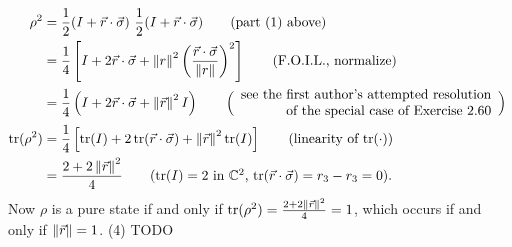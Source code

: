 \begin{align*}
    \rho^2 &= \frac{1}{2} (I + \vec{r} \cdot \vec{\sigma})~ \frac{1}{2} (I + \vec{r} \cdot \vec{\sigma}) \tag{part (1) above}\\
        &= \frac{1}{4} \left[ I + 2 \vec{r}\cdot \vec{\sigma} + \norm{r}^2\left(\frac{\vec{r}\cdot\vec{\sigma}}{\norm{r}}\right)^2\right] \tag{F.O.I.L., normalize}\\
        &= \frac{1}{4} \left(I + 2 \vec{r}\cdot \vec{\sigma} + \norm{\vec{r}}^2 I \right) \tag*{$\Bigl(\Bigr. \begin{array}{r}\text{see the first author's attempted resolution}\\ \text{ of the special case of Exercise 2.60}\end{array} \Bigl.\Bigr)$ }\\
    \Tr(\rho^2) &= \frac{1}{4}\left[\Tr(I)+2\Tr(\vec{r}\cdot\vec{\sigma}) + \norm{\vec{r}}^2\Tr(I)\right] \tag{linearity of $\Tr(\cdot)$} \\
    &=\frac{2+2\norm{\vec{r}}^2}{4} \tag{$\Tr(I)=2$ in $\mathbb{C}^2$, $\Tr(\vec{r}\cdot\vec{\sigma})=r_3-r_3 = 0$}.
\end{align*}
Now $\rho$ is a pure state if and only if $\operatorname{tr}(\rho^2) = \frac{2+2\left\lVert\vec{r}\right\rVert^2}{4} = 1$, which occurs if and only if $\left\lVert\vec{r}\right\rVert = 1$.\newline
\noindent(4) TODO

